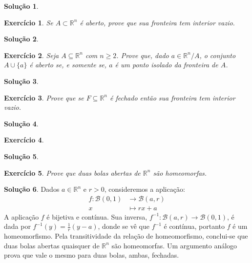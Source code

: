 \documentclass[a4paper,12pt]{article}
\newcommand{\R}{\mathbb{R}}
\newcommand{\B}{\mathcal{B}}
\theoremstyle{exer}
\newtheorem{exercise}{Exercício}
\theoremstyle{definition}
\newtheorem{solution}{Solução}
\theoremstyle{plain}
\begin{document}
\begin{solution}

\end{solution}

\begin{exercise}
    Se $A \subset \R^n$ é aberto, prove que sua fronteira tem interior vazio.
\end{exercise}

\begin{solution}

\end{solution}

\begin{exercise}
    Seja $A \subseteq \R^n$ com $n \ge 2$. Prove que, dado $a \in \R^n/A$, o
    conjunto $A \cup \{a\}$ é aberto se, e somente se, $a$ é um ponto isolado da
    fronteira de $A$. 
\end{exercise}

\begin{solution}

\end{solution}

\begin{exercise}
    Prove que se $F \subseteq \R^n$ é fechado então sua fronteira tem interior vazio.
\end{exercise}

\begin{solution}

\end{solution}

\begin{exercise}

\end{exercise}

\begin{solution}

\end{solution}

\begin{exercise}
    Prove que duas bolas abertas de $\R^n$ são homeomorfas.
\end{exercise}

\begin{solution}
    Dados $a \in \R^n$ e $r > 0$, consideremos a aplicação:
    \begin{align*}
        f : \B(0, 1) &\to \B(a, r)\\
        x &\mapsto rx + a        
    \end{align*}
    A aplicação $f$ é bijetiva e contínua. Sua inversa, $f^{-1} : \B(a, r) \to
    \B(0, 1)$, é dada por $f^{-1}(y) = \frac{1}{r}(y - a)$, donde se vê que
    $f^{-1}$ é contínua, portanto $f$ é um homeomorfismo. Pela transitividade
    da relação de homeomorfismo, conclui-se que duas bolas abertas quaisquer de
    $\R^n$ são homeomorfas. Um argumento análogo prova que vale o mesmo para duas bolas, ambas, fechadas.
\end{solution}
\end{document}
